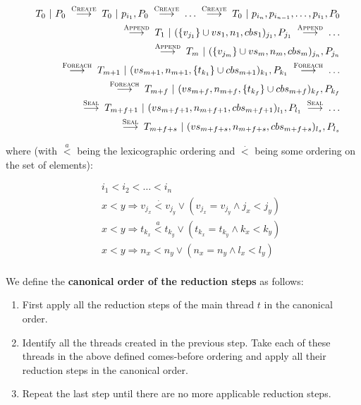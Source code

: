 \documentclass[runningheads,a4paper]{llncs}
\newcommand{\set}[1]{\{#1\}}
\begin{document}
\begin{definition}
\begin{eqnarray*}
& &T_0~|~P_0 \;\stackrel{\textsc{Create}}{\longrightarrow}\; T_0~|~p_{i_1},
P_0 \;\stackrel{\textsc{Create}}{\longrightarrow}\; \ldots
\;\stackrel{\textsc{Create}}{\longrightarrow}\;  T_0~|~p_{i_n},
p_{i_{n-1}}, \ldots, p_{i_1}, P_0 \\
& &\;\stackrel{\textsc{Append}}{\longrightarrow}\; T_1~|~(\set{v_{j_1}}
\cup vs_1, n_1, cbs_1)_{j_1}, P_{j_1}
\;\stackrel{\textsc{Append}}{\longrightarrow}\; \ldots \\
& &\;\stackrel{\textsc{Append}}{\longrightarrow}\;
T_m~|~(\set{v_{j_m}} \cup vs_m, n_m, cbs_m)_{j_n}, P_{j_n} \\
& & \;\stackrel{\textsc{Foreach}}{\longrightarrow}\;
T_{m+1}~|~(vs_{m+1}, n_{m+1}, \set{t_{k_1}} \cup cbs_{m+1})_{k_1}, P_{k_1}
\;\stackrel{\textsc{Foreach}}{\longrightarrow}\; \ldots \\
& & \;\stackrel{\textsc{Foreach}}{\longrightarrow}\;
T_{m+f}~|~(vs_{m+f}, n_{m+f}, \set{t_{k_f}} \cup cbs_{m+f})_{k_f}, P_{k_f} \\
& & \;\stackrel{\textsc{Seal}}{\longrightarrow}\;
T_{m+f+1}~|~(vs_{m+f+1}, n_{m+f+1}, cbs_{m+f+1})_{l_1}, P_{l_1}
\;\stackrel{\textsc{Seal}}{\longrightarrow}\; \ldots \\
& & \;\stackrel{\textsc{Seal}}{\longrightarrow}\;
T_{m+f+s}~|~(vs_{m+f+s}, n_{m+f+s}, cbs_{m+f+s})_{l_s}, P_{l_s}
\end{eqnarray*}

where (with $\stackrel{a}{<}$ being the lexicographic ordering and
$\stackrel{\cdot}{<}$ being some ordering on the set of elements):

\begin{eqnarray*}
& &i_1 < i_2 < \ldots < i_n \\
& &x < y \Rightarrow v_{j_x} \stackrel{\cdot}{<} v_{j_y} \vee (v_{j_x}
= v_{j_y} \wedge j_x < j_y)\\
& &x < y \Rightarrow t_{k_x} \stackrel{a}{<} t_{k_y} \vee (t_{k_x}
= t_{k_y} \wedge k_x < k_y)\\
& &x < y \Rightarrow n_x < n_y \vee (n_x = n_y \wedge l_x < l_y)\\
\end{eqnarray*}

We define the \textbf{canonical order of the reduction steps}
as follows:
\begin{enumerate}
\item First apply all the reduction steps of the main thread $t$ in
  the canonical order.
\item Identify all the threads created in the previous step. Take each
  of these threads in the above defined comes-before ordering and
  apply all their reduction steps in the canonical order.
\item Repeat the last step until there are no more applicable
  reduction steps.
\end{enumerate}


\end{definition}
\end{document}
